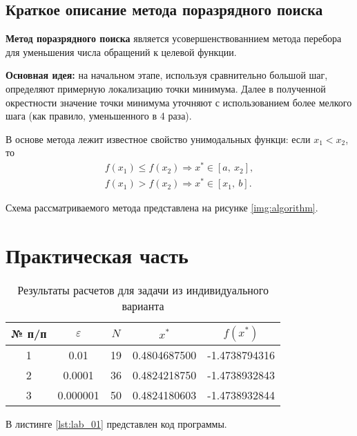 \documentclass{bmstu}
\begin{document}
\section{Краткое описание метода поразрядного поиска}

\textbf{Метод поразрядного поиска} является усовершенствованнием метода перебора для уменьшения числа обращений к целевой функции.

\textbf{Основная идея:} на начальном этапе, используя сравнительно большой шаг, определяют примерную локализацию точки минимума. Далее в полученной окрестности значение точки минимума уточняют с использованием более мелкого шага (как правило, уменьшенного в 4 раза).

В основе метода лежит известное свойство унимодальных функци: если $x_1 < x_2$, то
\begin{align}
    f(x_1) \leqslant f(x_2) \Rightarrow x^* \in [a, \ x_2], \nonumber \\
    f(x_1) > f(x_2) \Rightarrow x^* \in [x_1, \ b].
\end{align}

Схема рассматриваемого метода представлена на рисунке \ref{img:algorithm}. 



\chapter{Практическая часть}

\begin{table}[H]
    \centering
	\caption{Результаты расчетов для задачи из индивидуального варианта}
    \label{tbl:task}
	\begin{tabular}{|c|c|c|c|c|}
        \hline
        № п/п & $\varepsilon$ & $N$ & $x^*$ & $f(x^*)$ \\ \hline
        1 & 0.01 & 19 & 0.4804687500 & -1.4738794316 \\ \hline
        2 & 0.0001 & 36 & 0.4824218750 & -1.4738932843 \\ \hline
        3 & 0.000001 & 50 & 0.4824180603 & -1.4738932844 \\ \hline
    \end{tabular}
\end{table}

В листинге \ref{lst:lab_01} представлен код программы.

\end{document}
